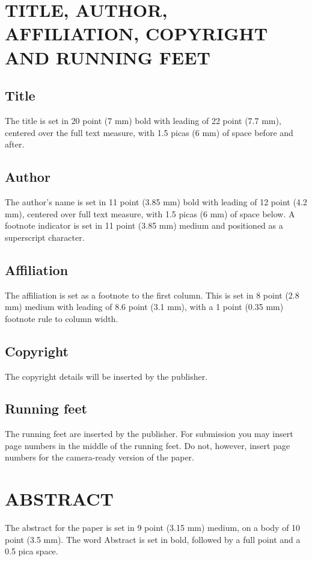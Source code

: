 \documentclass{ecai2012}
\begin{document}
\section{TITLE, AUTHOR, AFFILIATION, COPYRIGHT
AND RUNNING FEET}
\subsection{Title}
The title is set in 20 point (7 mm) bold with leading of 22 point (7.7
mm), centered over the full text measure, with 1.5 picas (6 mm) of
space before and after.

\subsection{Author}
The author's name is set in 11 point (3.85 mm) bold with leading of 12
point (4.2 mm), centered over full text measure, with 1.5 picas (6 mm)
of space below. A footnote indicator is set in 11 point (3.85 mm)
medium and positioned as a superscript character.

\subsection{Affiliation}
The affiliation is set as a footnote to the first column. This is set
in 8 point (2.8 mm) medium with leading of 8.6 point (3.1 mm), with a
1 point (0.35 mm) footnote rule to column width.

\subsection{Copyright}
The copyright details will be inserted by the publisher.

\subsection{Running feet}
The running feet are inserted by the publisher. For submission you may
insert page numbers in the middle of the running feet. Do not,
however, insert page numbers for the camera-ready version of the
paper.

\section{ABSTRACT}
The abstract for the paper is set in 9 point (3.15 mm) medium, on a
body of 10 point (3.5 mm). The word Abstract is set in bold, followed
by a full point and a 0.5 pica space.
\end{document}
